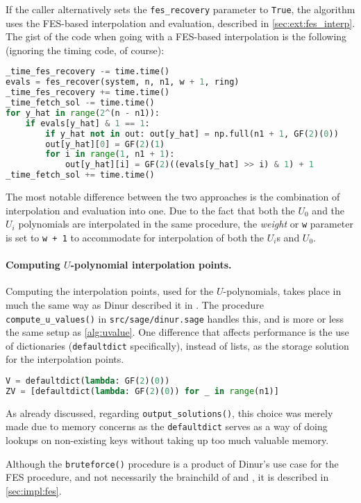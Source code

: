If the caller alternatively sets the \texttt{fes\_recovery} parameter to \texttt{True}, the algorithm uses the FES-based interpolation and evaluation, described in \cref{sec:ext:fes_interp}. The gist of the code when going with a FES-based interpolation is the following (ignoring the timing code, of course):
\begin{lstlisting}[language=Python,style=mystyle]
_time_fes_recovery -= time.time()
evals = fes_recover(system, n, n1, w + 1, ring)
_time_fes_recovery += time.time()
_time_fetch_sol -= time.time()
for y_hat in range(2^(n - n1)):
    if evals[y_hat] & 1 == 1:
        if y_hat not in out: out[y_hat] = np.full(n1 + 1, GF(2)(0))
        out[y_hat][0] = GF(2)(1)
        for i in range(1, n1 + 1):
            out[y_hat][i] = GF(2)((evals[y_hat] >> i) & 1) + 1
_time_fetch_sol += time.time()
\end{lstlisting}
The most notable difference between the two approaches is the combination of interpolation and evaluation into one. Due to the fact that both the $U_0$ and the $U_i$ polynomials are interpolated in the same procedure, the \textit{weight} or \texttt{w} parameter is set to \texttt{w + 1} to accommodate for interpolation of both the $U_i$s and $U_0$.

\paragraph{Computing $U$-polynomial interpolation points.} Computing the interpolation points, used for the $U$-polynomials, takes place in much the same way as Dinur described it in \cite{cryptoeprint:2021/578}. The procedure \texttt{compute\_u\_values()} in \texttt{src/sage/dinur.sage} handles this, and is more or less the same setup as \cref{alg:uvalue}. One difference that affects performance is the use of dictionaries (\texttt{defaultdict} specifically), instead of lists, as the storage solution for the interpolation points. 
\begin{lstlisting}[language=Python,style=mystyle]
V = defaultdict(lambda: GF(2)(0))
ZV = [defaultdict(lambda: GF(2)(0)) for _ in range(n1)]
\end{lstlisting}
As already discussed, regarding \texttt{output\_solutions()}, this choice was merely made due to memory concerns as the \texttt{defaultdict} serves as a way of doing lookups on non-existing keys without taking up too much valuable memory.

Although the \texttt{bruteforce()} procedure is a product of Dinur's use case for the FES procedure, and not necessarily the brainchild of \cite{cryptoeprint:2013/436} and \cite{cryptoeprint:2010/313}, it is described in \cref{sec:impl:fes}.

